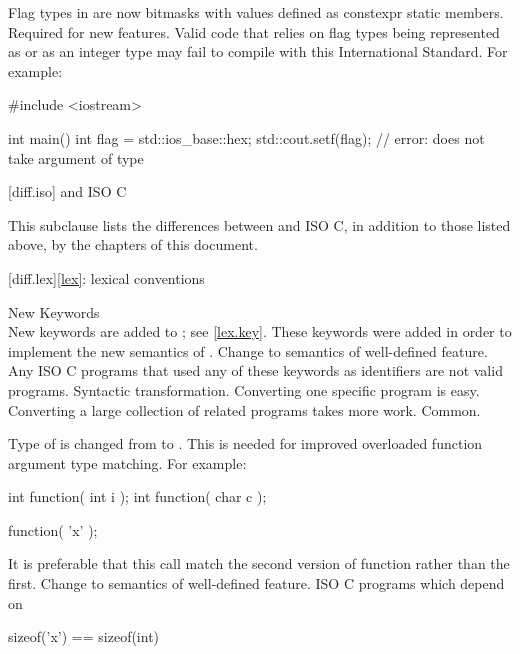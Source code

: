\change
Flag types in  are now bitmasks with values
defined as constexpr static members.
\rationale
Required for new features.
\effect
Valid \CppIII{} code that relies on  flag types being
represented as  or as an integer type may fail to compile
with this International Standard. For example:
\begin{codeblock}
#include <iostream>

int main() {
  int flag = std::ios_base::hex;
  std::cout.setf(flag);         // error:  does not take argument of type 
}
\end{codeblock}

[diff.iso]{\Cpp{} and ISO C}

\pnum
{}%
This subclause lists the differences between \Cpp{} and ISO C,
in addition to those listed above,
by the chapters of this document.

[diff.lex]{\ref{lex}: lexical conventions}

\change
New Keywords\\
New keywords are added to \Cpp{};
see \ref{lex.key}.
\rationale
These keywords were added in order to implement the new
semantics of \Cpp{}.
\effect
Change to semantics of well-defined feature.
Any ISO C programs that used any of these keywords as identifiers
are not valid \Cpp{} programs.
\difficulty
Syntactic transformation.
Converting one specific program is easy.
Converting a large collection
of related programs takes more work.
\howwide
Common.

\change
Type of  is changed from  to .
\rationale
This is needed for improved overloaded function argument type
matching.
For example:

\begin{codeblock}
int function( int i );
int function( char c );

function( 'x' );
\end{codeblock}

It is preferable that this call match the second version of
function rather than the first.
\effect
Change to semantics of well-defined feature.
ISO C programs which depend on

\begin{codeblock}
sizeof('x') == sizeof(int)
\end{codeblock}

